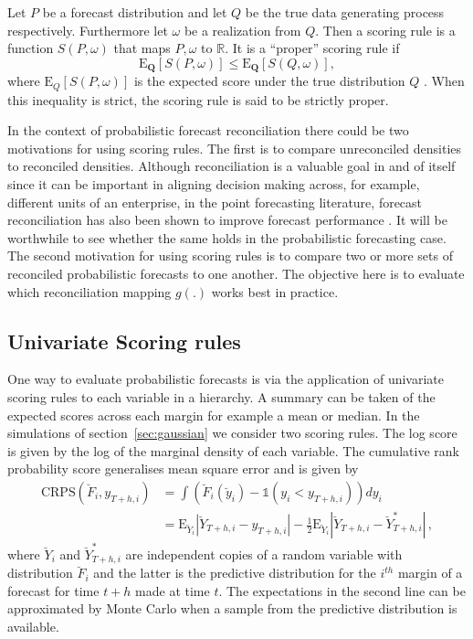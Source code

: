 \documentclass[a4paper, 11pt]{article}
\def\E{\text{E}}
\theoremstyle{theo}
\theoremstyle{definition}
\begin{document}
Let $P$ be a forecast distribution and let $Q$ be the true data generating process respectively. Furthermore let $\omega$ be a realization from $Q$. Then a scoring rule is a function $S(P,\omega)$ that maps $P,\omega$ to $\mathbb{R}$. It is a ``proper'' scoring rule if 
\begin{equation}\label{eq:(3.1.)}
\E_{\bm{Q}}[S(P,\omega)] \le \E_{\bm{Q}}[S(Q,\omega)],
\end{equation}
where $\E_{Q}[S(P,\omega)]$ is the expected score under the true distribution $Q$ \citep{Gneiting2008, Gneiting2014}.  When this inequality is strict, the scoring rule is said to be strictly proper.

In the context of probabilistic forecast reconciliation there could be two motivations for using scoring rules.  The first is to compare unreconciled densities to reconciled densities.  Although reconciliation is a valuable goal in and of itself since it can be important in aligning decision making across, for example, different units of an enterprise, in the point forecasting literature, forecast reconciliation has also been shown to improve forecast performance .  It will be worthwhile to see whether the same holds in the probabilistic forecasting case.  The second motivation for using scoring rules is to compare two or more sets of reconciled probabilistic forecasts to one another.  The objective here is to evaluate which reconciliation mapping $g(.)$ works best in practice.

\subsection{Univariate Scoring rules}

One way to evaluate probabilistic forecasts is via the application of univariate scoring rules to each variable in a hierarchy.  A summary can be taken of the expected scores across each margin for example a mean or median.  In the simulations of section~\ref{sec:gaussian} we consider two scoring rules.  The log score is given by the log of the marginal density of each variable.  The cumulative rank probability score generalises mean square error and is given by
\begin{align} \label{eq:CRPS}
\text{CRPS}(\breve{F}_i,y_{T+h,i}) &=\int \left(\breve{F}_i(\breve{y}_i)-\mathbb{1}(y_i<y_{T+h,i})\right)dy_i\\ &=\E_{\breve{Y}_i}|\breve{Y}_{T+h,i}-y_{T+h,i}| - \frac{1}{2}\E_{\breve{Y}_i}|\breve{Y}_{T+h,i}-\breve{Y}^*_{T+h,i}|\,,
\end{align}
where $\breve{Y}_i$ and $\breve{Y}^*_{T+h,i}$ are independent copies of a random variable with distribution $\breve{F}_i$ and the latter is the predictive distribution for the $i^{th}$ margin of a forecast for time $t+h$ made at time $t$. The expectations in the second line can be approximated by Monte Carlo when a sample from the predictive distribution is available.
\end{document}
